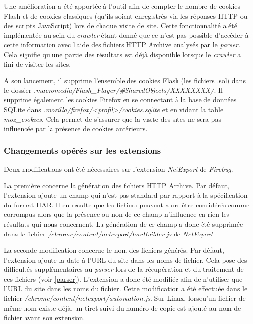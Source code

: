 Une amélioration a été apportée à l'outil afin de compter le nombre de cookies Flash et de cookies classiques (qu'ils soient enregistrés via les réponses HTTP ou des scripts JavaScript) lors de chaque visite de site. Cette fonctionnalité a été implémentée au sein du \textit{crawler} étant donné que ce n'est pas possible d'accéder à cette information avec l'aide des fichiers HTTP Archive analysés par le \textit{parser}. Cela signifie qu'une partie des résultats est déjà disponible lorsque le \textit{crawler} a fini de visiter les sites.

A son lancement, il supprime l'ensemble des cookies Flash (les fichiers .sol) dans le dossier \textit{.macromedia/Flash\_Player/\#SharedObjects/XXXXXXXX/}. Il supprime également les cookies Firefox en se connectant à la base de données SQLite dans \textit{.mozilla/firefox/<profil>/cookies.sqlite} et en vidant la table \textit{moz\_cookies}. Cela permet de s'assurer que la visite des sites ne sera pas influencée par la présence de cookies antérieurs.

\subsubsection{Changements opérés sur les extensions}
\label{changements_extensions}
Deux modifications ont été nécessaires sur l'extension \textit{NetExport} de \textit{Firebug}.

La première concerne la génération des fichiers HTTP Archive. Par défaut, l'extension ajoute un champ qui n'est pas standard par rapport à la spécification du format HAR. Il en résulte que les fichiers peuvent alors être considérés comme corrompus alors que la présence ou non de ce champ n'influence en rien les résultats qui nous concernent. La génération de ce champ a donc été supprimée dans le fichier \textit{/chrome/content/netexport/harBuilder.js} de \textit{NetExport}.

La seconde modification concerne le nom des fichiers générés. Par défaut, l'extension ajoute la date à l'URL du site dans les noms de fichier. Cela pose des difficultés supplémentaires au \textit{parser} lors de la récupération et du traitement de ces fichiers (voir \autoref{parser}). L'extension a donc été modifiée afin de n'utiliser que l'URL du site dans les noms du fichier. Cette modification a été effectuée dans le fichier \textit{/chrome/content/netexport/automation.js}. Sur Linux, lorsqu'un fichier de même nom existe déjà, un tiret suivi du numéro de copie est ajouté au nom de fichier avant son extension.

